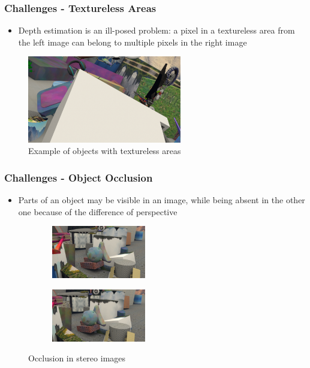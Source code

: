 \documentclass{beamer}
\begin{document}
\begin{frame}
\frametitle{Challenges - Textureless Areas}
\center
\begin{itemize}
	\item Depth estimation is an ill-posed problem: a pixel in a textureless area from the left image can belong to multiple pixels in the right image
\end{itemize}
\begin{figure}
    \centering
        \includegraphics[width=0.6\textwidth]{textureless.png}
        \caption{Example of objects with textureless areas}
    \end{figure}
\end{frame}

\begin{frame}
\frametitle{Challenges - Object Occlusion}
\center
\begin{itemize}
	\item Parts of an object may be visible in an image, while being absent in the other one because of the difference of perspective
\end{itemize}
\begin{figure}
	\centering
	\begin{subfigure}
		\centering
    	\includegraphics[width=0.45\textwidth]{occlusion_left.png}
    \end{subfigure}
    \begin{subfigure}
		\centering
        \includegraphics[width=0.45\textwidth]{occlusion_right.png}
    \end{subfigure}
    \caption{Occlusion in stereo images}
\end{figure}
\end{frame}
\end{document}
